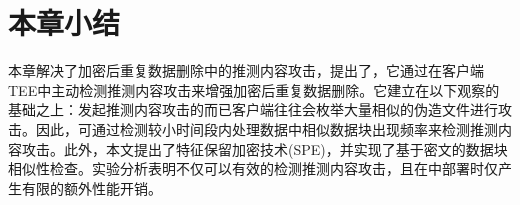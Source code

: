 \section{本章小结}
\label{sec:featurespy-conclusion}
本章解决了加密后重复数据删除中的推测内容攻击，提出了\sysnameF，它通过在客户端TEE中主动检测推测内容攻击来增强加密后重复数据删除。它建立在以下观察的基础之上：发起推测内容攻击的而已客户端往往会枚举大量相似的伪造文件进行攻击。因此，可通过检测较小时间段内处理数据中相似数据块出现频率来检测推测内容攻击。此外，本文提出了特征保留加密技术(SPE)，并实现了基于密文的数据块相似性检查。实验分析表明\sysnameF 不仅可以有效的检测推测内容攻击，且在\sysnameS 中部署时仅产生有限的额外性能开销。
